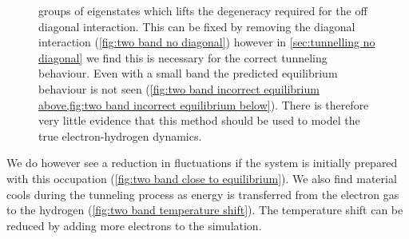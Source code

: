 \begin{figure}[htbp]
{        groups of eigenstates which
        lifts the degeneracy required for
        the off diagonal interaction.
        This can be fixed by removing
        the diagonal interaction
        (\cref{fig:two band no diagonal})
        however in
        \cref{sec:tunnelling no diagonal}
        we find this is
        necessary for the correct
        tunneling behaviour.
        Even with a small band
        the
        predicted equilibrium
        behaviour is not seen
        (\cref{fig:two band incorrect equilibrium above,fig:two band incorrect equilibrium below}).
        There is therefore very
        little evidence that
        this method
        should be used to model
        the true
        electron-hydrogen dynamics.
    }\label{fig:issue with two band approach}
\end{figure}
We do however see a reduction in
fluctuations if the system is initially
prepared with this occupation
(\cref{fig:two band close to equilibrium}).
We also find material cools
during the tunneling process
as energy is transferred
from the electron gas to the hydrogen
(\cref{fig:two band temperature shift}).
The temperature
shift can be reduced by adding
more electrons to the
simulation.
